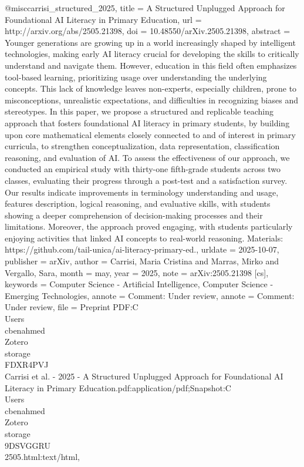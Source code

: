 
@misc{carrisi_structured_2025,
	title = {A {Structured} {Unplugged} {Approach} for {Foundational} {AI} {Literacy} in {Primary} {Education}},
	url = {http://arxiv.org/abs/2505.21398},
	doi = {10.48550/arXiv.2505.21398},
	abstract = {Younger generations are growing up in a world increasingly shaped by intelligent technologies, making early 
AI literacy crucial for developing the skills to critically understand and navigate them. However, education in this field often 
emphasizes tool-based learning, prioritizing usage over understanding the underlying concepts. This lack of knowledge leaves 
non-experts, especially children, prone to misconceptions, unrealistic expectations, and difficulties in recognizing biases and 
stereotypes. In this paper, we propose a structured and replicable teaching approach that fosters foundational AI literacy in 
primary students, by building upon core mathematical elements closely connected to and of interest in primary curricula, to 
strengthen conceptualization, data representation, classification reasoning, and evaluation of AI. To assess the effectiveness 
of our approach, we conducted an empirical study with thirty-one fifth-grade students across two classes, evaluating their 
progress through a post-test and a satisfaction survey. Our results indicate improvements in terminology understanding and 
usage, features description, logical reasoning, and evaluative skills, with students showing a deeper comprehension of 
decision-making processes and their limitations. Moreover, the approach proved engaging, with students particularly enjoying 
activities that linked AI concepts to real-world reasoning. Materials: https://github.com/tail-unica/ai-literacy-primary-ed.},
	urldate = {2025-10-07},
	publisher = {arXiv},
	author = {Carrisi, Maria Cristina and Marras, Mirko and Vergallo, Sara},
	month = may,
	year = {2025},
	note = {arXiv:2505.21398 [cs]},
	keywords = {Computer Science - Artificial Intelligence, Computer Science - Emerging Technologies},
	annote = {Comment: Under review},
	annote = {Comment: Under review},
	file = {Preprint PDF:C\:\\Users\\cbenahmed\\Zotero\\storage\\FDXR4PVJ\\Carrisi et al. - 2025 - A Structured Unplugged 
Approach for Foundational AI Literacy in Primary 
Education.pdf:application/pdf;Snapshot:C\:\\Users\\cbenahmed\\Zotero\\storage\\9DSVGGRU\\2505.html:text/html},
}


